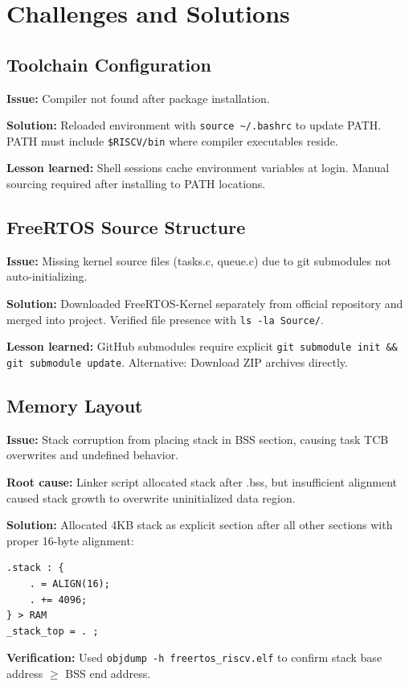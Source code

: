 \documentclass[conference]{IEEEtran}
\begin{document}
\section{Challenges and Solutions}

\subsection{Toolchain Configuration}
\textbf{Issue:} Compiler not found after package installation.

\textbf{Solution:} Reloaded environment with \texttt{source \textasciitilde/.bashrc} to update PATH. PATH must include \texttt{\$RISCV/bin} where compiler executables reside.

\textbf{Lesson learned:} Shell sessions cache environment variables at login. Manual sourcing required after installing to PATH locations.

\subsection{FreeRTOS Source Structure}
\textbf{Issue:} Missing kernel source files (tasks.c, queue.c) due to git submodules not auto-initializing.

\textbf{Solution:} Downloaded FreeRTOS-Kernel separately from official repository and merged into project. Verified file presence with \texttt{ls -la Source/}.

\textbf{Lesson learned:} GitHub submodules require explicit \texttt{git submodule init && git submodule update}. Alternative: Download ZIP archives directly.

\subsection{Memory Layout}
\textbf{Issue:} Stack corruption from placing stack in BSS section, causing task TCB overwrites and undefined behavior.

\textbf{Root cause:} Linker script allocated stack after .bss, but insufficient alignment caused stack growth to overwrite uninitialized data region.

\textbf{Solution:} Allocated 4KB stack as explicit section after all other sections with proper 16-byte alignment:
\begin{lstlisting}
.stack : {
    . = ALIGN(16);
    . += 4096;
} > RAM
_stack_top = . ;
\end{lstlisting}

\textbf{Verification:} Used \texttt{objdump -h freertos\_riscv.elf} to confirm stack base address \(\geq\) BSS end address.
\end{document}
